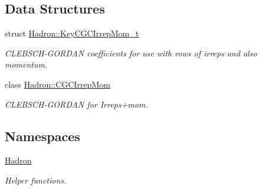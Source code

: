 \subsection*{Data Structures}
\begin{DoxyCompactItemize}
\item 
struct \mbox{\hyperlink{structHadron_1_1KeyCGCIrrepMom__t}{Hadron\+::\+Key\+C\+G\+C\+Irrep\+Mom\+\_\+t}}
\begin{DoxyCompactList}\small\item\em C\+L\+E\+B\+S\+C\+H-\/\+G\+O\+R\+D\+AN coefficients for use with rows of irreps and also momentum. \end{DoxyCompactList}\item 
class \mbox{\hyperlink{classHadron_1_1CGCIrrepMom}{Hadron\+::\+C\+G\+C\+Irrep\+Mom}}
\begin{DoxyCompactList}\small\item\em C\+L\+E\+B\+S\+C\+H-\/\+G\+O\+R\+D\+AN for Irreps+mom. \end{DoxyCompactList}\end{DoxyCompactItemize}
\subsection*{Namespaces}
\begin{DoxyCompactItemize}
\item 
 \mbox{\hyperlink{namespaceHadron}{Hadron}}
\begin{DoxyCompactList}\small\item\em Helper functions. \end{DoxyCompactList}\end{DoxyCompactItemize}
